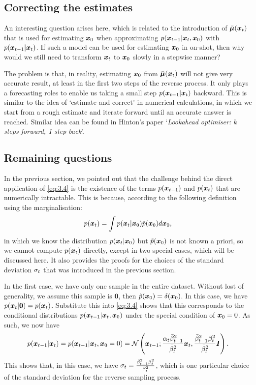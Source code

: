 \subsection{Correcting the estimates}
An interesting question arises here, which is related to the introduction of $\bar{\bm{\mu}}(\bm{x}_{t})$ that is used for estimating $\bm{x}_0$ when approximating $p(\bm{x}_{t-1}|\bm{x}_{t},\bm{x}_0)$ with $p(\bm{x}_{t-1}|\bm{x}_{t})$. If such a model can be used for estimating $\bm{x}_0$ in on-shot, then why would we still need to transform $\bm{x}_{t}$ to $\bm{x}_0$ slowly in a stepwise manner?

The problem is that, in reality, estimating $\bm{x}_0$ from $\bar{\bm{\mu}}(\bm{x}_{t})$ will not give very accurate result, at least in the first two steps of the reverse process. It only plays a forecasting roles to enable us taking a small step $p(\bm{x}_{t-1}|\bm{x}_{t})$ backward. This is similar to the idea of `estimate-and-correct' in numerical calculations, in which we start from a rough estimate and iterate forward until an accurate answer is reached. Similar idea can be found in Hinton's paper `\textit{Lookahead optimiser: $k$ steps forward, 1 step back}'.\cite{zhang2019lookahead}


\subsection{Remaining questions}
In the previous section, we pointed out that the challenge behind the direct application of \cref{eq:3.4} is the existence of the terms $p(\bm{x}_{t-1})$ and $p(\bm{x}_{t})$ that are numerically intractable. This is because, according to the following definition using the marginalisation:
\begin{equation}
    \label{eq:3.15}
    p(\bm{x}_{t})=\int p(\bm{x}_{t}|\bm{x}_0)\tilde{p}(\bm{x}_0)d\bm{x}_0,
\end{equation}
in which we know the distribution $p(\bm{x}_{t}|\bm{x}_0)$ but $\tilde{p}(\bm{x}_0)$ is not known a priori, so we cannot compute $p(\bm{x}_{t})$ directly, except in two special cases, which will be discussed here. It also provides the proofs for the choices of the standard deviation $\sigma_t$ that was introduced in the previous section. 

In the first case, we have only one sample in the entire dataset. Without lost of generality, we assume this sample is $\bm{0}$, then $\tilde{p}(\bm{x}_0)=\delta(\bm{x}_0)$. In this case, we have $p(\bm{x}_{t}|\bm{0})=p(\bm{x}_{t})$. Substitute this into \cref{eq:3.4} shows that this corresponds to the conditional distributions $p(\bm{x}_{t-1}|\bm{x}_{t},\bm{x}_0)$ under the special condition of $\bm{x}_0=0$. As such, we now have 
\begin{equation}
    \label{eq:3.16}
    p(\bm{x}_{t-1}|\bm{x}_{t})=p(\bm{x}_{t-1}|\bm{x}_{t},\bm{x}_0=0)=\mathcal{N}\left(\bm{x}_{t-1}; \frac{\alpha_t\bar{\beta}_{t-1}^2}{\bar{\beta}_t^2}\bm{x}_{t}, \frac{\bar{\beta}_{t-1}^2\beta_t^2}{\bar{\beta}_t^2}\bm{I} \right).
\end{equation}
This shows that, in this case, we have \textcolor{red}{$\sigma_t=\frac{\bar{\beta}_{t-1}^2\beta_t^2}{\bar{\beta}_t^2}$}, which is one particular choice of the standard deviation for the reverse sampling process.

